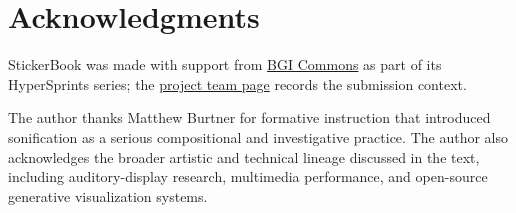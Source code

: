 \documentclass[11pt]{article}
\begin{document}
\clearpage
\section*{Acknowledgments}
StickerBook was made with support from \href{https://bgicommons.org/}{BGI Commons} as part of its HyperSprints series; the \href{https://bgicommons.org/teams/62}{project team page} records the submission context.

The author thanks Matthew Burtner for formative instruction that introduced sonification as a serious compositional and investigative practice. The author also acknowledges the broader artistic and technical lineage discussed in the text, including auditory-display research, multimedia performance, and open-source generative visualization systems.

\printbibliography
\end{document}

